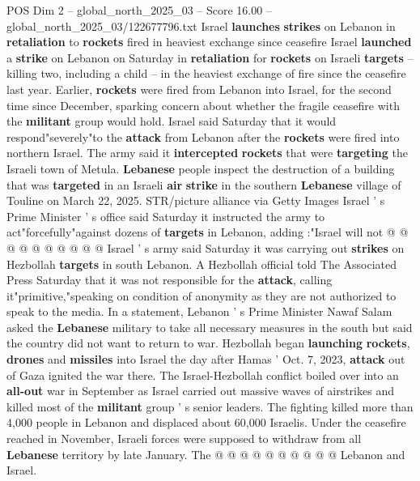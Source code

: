 \begin{textsample}{POS Dim 2 – global\_north\_2025\_03 – Score 16.00 – global\_north\_2025\_03/122677796.txt}  \label{ex:f2_pos_420}
Israel \textbf{launches} \textbf{strikes} on Lebanon in \textbf{retaliation} to \textbf{rockets} fired in heaviest exchange since ceasefire Israel \textbf{launched} a \textbf{strike} on Lebanon on Saturday in \textbf{retaliation} for \textbf{rockets} on Israeli \textbf{targets} -- killing two, including a child -- in the heaviest exchange of fire since the ceasefire last year.
Earlier, \textbf{rockets} were fired from Lebanon into Israel, for the second time since December, sparking concern about whether the fragile ceasefire with the \textbf{militant} group would hold.
Israel said Saturday that it would respond"severely"to the \textbf{attack} from Lebanon after the \textbf{rockets} were fired into northern Israel.
The army said it \textbf{intercepted} \textbf{rockets} that were \textbf{targeting} the Israeli town of Metula. \textbf{Lebanese} people inspect the destruction of a building that was \textbf{targeted} in an Israeli \textbf{air} \textbf{strike} in the southern \textbf{Lebanese} village of Touline on March 22, 2025.
STR/picture alliance via Getty Images Israel ' s Prime Minister ' s office said Saturday it instructed the army to act"forcefully"against dozens of \textbf{targets} in Lebanon, adding :"Israel will not @ @ @ @ @ @ @ @ @ @ Israel ' s army said Saturday it was carrying out \textbf{strikes} on Hezbollah \textbf{targets} in south Lebanon.
A Hezbollah official told The Associated Press Saturday that it was not responsible for the \textbf{attack}, calling it"primitive,"speaking on condition of anonymity as they are not authorized to speak to the media.
In a statement, Lebanon ' s Prime Minister Nawaf Salam asked the \textbf{Lebanese} military to take all necessary measures in the south but said the country did not want to return to war.
Hezbollah began \textbf{launching} \textbf{rockets}, \textbf{drones} and \textbf{missiles} into Israel the day after Hamas ' Oct. 7, 2023, \textbf{attack} out of Gaza ignited the war there.
The Israel-Hezbollah conflict boiled over into an \textbf{all-out} war in September as Israel carried out massive waves of airstrikes and killed most of the \textbf{militant} group ' s senior leaders.
The fighting killed more than 4,000 people in Lebanon and displaced about 60,000 Israelis.
Under the ceasefire reached in November, Israeli forces were supposed to withdraw from all \textbf{Lebanese} territory by late January.
The @ @ @ @ @ @ @ @ @ @ Lebanon and Israel.

\end{textsample}
